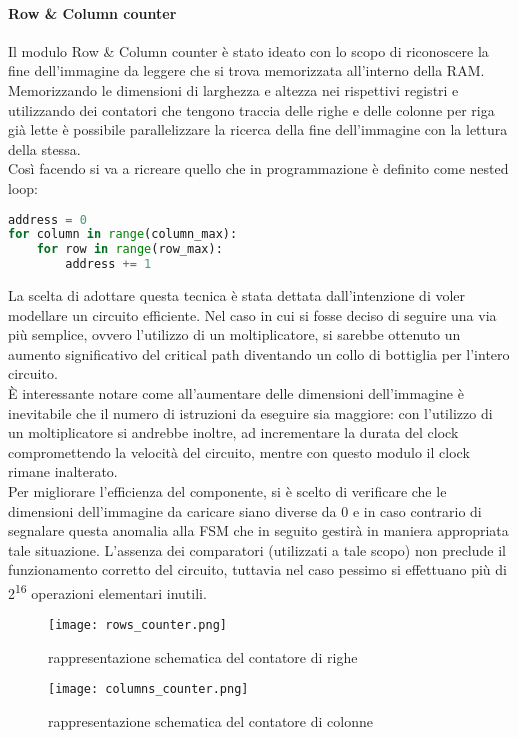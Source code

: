 \paragraph{Row \& Column counter\\}

Il modulo Row \& Column counter è stato ideato con lo scopo di riconoscere la fine dell'immagine da leggere che si trova memorizzata all'interno della RAM.\\
Memorizzando le dimensioni di larghezza e altezza nei rispettivi registri e utilizzando dei contatori che tengono traccia delle righe e delle colonne per riga già lette è possibile parallelizzare la ricerca della fine dell'immagine con la lettura della stessa.\\
Così facendo si va a ricreare quello che in programmazione è definito come nested loop:

\begin{lstlisting}[language=Python, caption=nested loop in pseudocode]
address = 0
for column in range(column_max):
    for row in range(row_max):
        address += 1
\end{lstlisting}
La scelta di adottare questa tecnica è stata dettata dall'intenzione di voler modellare un circuito efficiente. Nel caso in cui si fosse deciso di seguire una via più semplice, ovvero l'utilizzo di un moltiplicatore, si sarebbe ottenuto un aumento significativo del critical path diventando un collo di bottiglia per l'intero circuito.\\
È interessante notare come all'aumentare delle dimensioni dell'immagine è inevitabile che il numero di istruzioni da eseguire sia maggiore: con l'utilizzo di un moltiplicatore si andrebbe inoltre, ad incrementare la durata del clock compromettendo la velocità del circuito, mentre con questo modulo il clock rimane inalterato.\\
Per migliorare l'efficienza del componente, si è scelto di verificare che le dimensioni dell'immagine da caricare siano diverse da 0 e in caso contrario di segnalare questa anomalia alla FSM che in seguito gestirà in maniera appropriata tale situazione. L'assenza dei comparatori (utilizzati a tale scopo) non preclude il funzionamento corretto del circuito, tuttavia nel caso pessimo si effettuano più di 2\textsuperscript{16} operazioni elementari inutili.

\begin{figure}[h]
\caption{rappresentazione schematica del contatore di righe}
\centering
\texttt{[image: rows\_counter.png]}%
\end{figure}
\begin{figure}[h]
\caption{rappresentazione schematica del contatore di colonne}
\centering
\texttt{[image: columns\_counter.png]} %
\end{figure}
